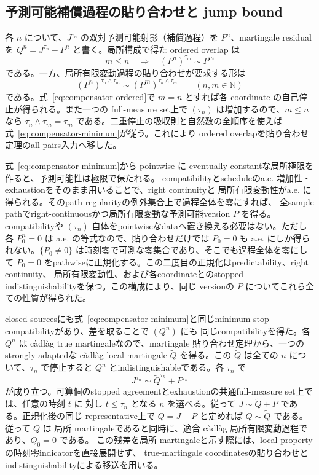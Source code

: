 \subsection{予測可能補償過程の貼り合わせと jump bound}

各 $n$ について、$J^{\tau_n}$ の双対予測可能射影（補償過程）を $P^n$、martingale residualを
$Q^n=J^{\tau_n}-P^n$ と書く。局所構成で得た ordered overlap は
\begin{equation}
 m\leq n\quad\Longrightarrow\quad (P^n)^{\tau_m}\sim P^m
 \label{eq:compensator-ordered}
\end{equation}
である。一方、局所有限変動過程の貼り合わせが要求する形は
\begin{equation}
 (P^n)^{\tau_n\wedge\tau_m}\sim
 (P^m)^{\tau_n\wedge\tau_m}\qquad(n,m\in\mathbb N)
 \label{eq:compensator-minimum}
\end{equation}
である。式~\eqref{eq:compensator-ordered}で $m=n$ とすれば各 coordinate の自己停止が得られる。また一つの
full-measure set上で $(\tau_n)$ は増加するので、$m\leq n$ なら
$\tau_n\wedge\tau_m=\tau_m$ である。二重停止の吸収則と自然数の全順序を使えば
式~\eqref{eq:compensator-minimum}が従う。これにより ordered overlapを貼り合わせ定理のall-pairs入力へ移した。

式~\eqref{eq:compensator-minimum}から pointwise に eventually constantな局所極限を作ると、予測可能性は極限で保たれる。
compatibilityとscheduleのa.e. 増加性・exhaustionをそのまま用いることで、right continuityと
局所有限変動性がa.e. に得られる。そのpath-regularityの例外集合上で過程全体を零にすれば、
全sample pathでright-continuousかつ局所有限変動な予測可能version $P$ を得る。
compatibilityや $(\tau_n)$ 自体をpointwiseなdataへ置き換える必要はない。ただし各 $P^n_0=0$ は
a.e. の等式なので、貼り合わせだけでは $P_0=0$ も
a.e. にしか得られない。$\{P_0\neq0\}$ は時刻零で可測な零集合であり、そこでも過程全体を零にして
$P_0=0$ をpathwiseに正規化する。この二度目の正規化はpredictability、right continuity、
局所有限変動性、および各coordinateとのstopped indistinguishabilityを保つ。この構成により、同じ
versionの $P$ についてこれら全ての性質が得られた。

closed sourcesにも式~\eqref{eq:compensator-minimum}と同じminimum-stop compatibilityがあり、差を取ることで $(Q^n)$ にも
同じcompatibilityを得た。各 $Q^n$ は c\`adl\`ag true martingaleなので、martingale
貼り合わせ定理から、一つのstrongly adaptedな c\`adl\`ag local martingale $\widetilde Q$ を得る。この
$\widetilde Q$ は全ての $n$ について、$\tau_n$ で停止すると $Q^n$ とindistinguishableである。各
$\tau_n$ で
\[
 J^{\tau_n}\sim \widetilde Q^{\tau_n}+P^{\tau_n}
\]
が成り立つ。可算個のstopped agreementとexhaustionの共通full-measure set上では、任意の時刻 $t$ に
対し $t\leq\tau_n$ となる $n$ を選べる。従って $J\sim\widetilde Q+P$ である。正規化後の同じ
representative上で $Q=J-P$ と定めれば $Q\sim\widetilde Q$ である。従って $Q$ は
局所 martingaleであると同時に、適合 c\`adl\`ag 局所有限変動過程であり、$Q_0=0$ である。
この残差を局所 martingaleと示す際には、local propertyの時刻零indicatorを直接展開せず、
true-martingale coordinatesの貼り合わせとindistinguishabilityによる移送を用いる。

